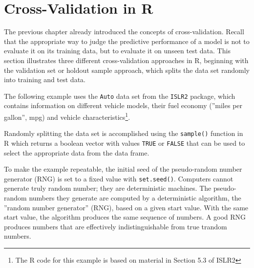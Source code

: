 \section{Cross-Validation in R}

The previous chapter already introduced the concepts of cross-validation. Recall that the appropriate way to judge the predictive performance of a model is not to evaluate it on its training data, but to evaluate it on unseen test data. This section illustrates three different cross-validation approaches in R, beginning with the validation set or holdout sample approach, which splits the data set randomly into training and test data. 

The following example uses the \texttt{Auto} data set from the \texttt{ISLR2} package, which contains information on different vehicle models, their fuel economy (''miles per gallon'', mpg) and vehicle characteristics\footnote{The R code for this example is based on material in Section 5.3 of ISLR2}.

Randomly splitting the data set is accomplished using the \texttt{sample()} function in R which returns a boolean vector with values \texttt{TRUE} or \texttt{FALSE} that can be used to select the appropriate data from the data frame. 

To make the example repeatable, the initial seed of the pseudo-random number generator (RNG) is set to a fixed value with \texttt{set.seed()}. Computers cannot generate truly random number; they are deterministic machines. The pseudo-random numbers they generate are computed by a deterministic algorithm, the ''random number generator'' (RNG), based on a given start value. With the same start value, the algorithm produces the same sequence of numbers. A good RNG produces numbers that are effectively indistinguishable from true trandom numbers.

\begin{samepage}
\end{samepage}

